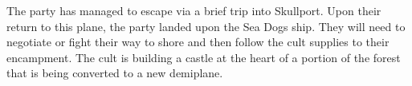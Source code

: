 The party has managed to escape via a brief trip into Skullport.
Upon their return to this plane, the party landed upon the Sea Dogs ship.
They will need to negotiate or fight their way to shore and then follow the cult supplies to their encampment.
The cult is building a castle at the heart of a portion of the forest that is being converted to a new demiplane.
